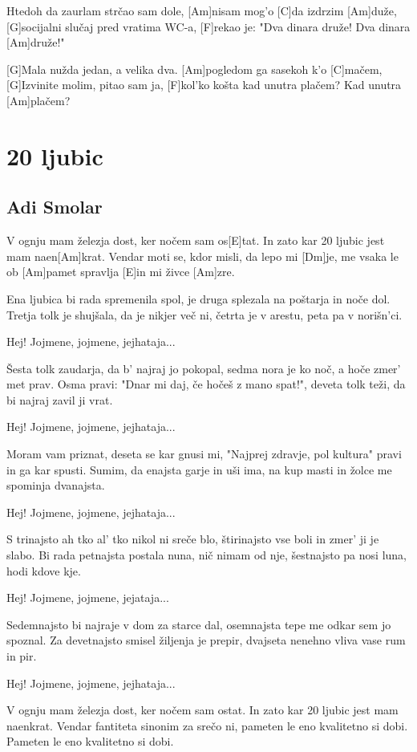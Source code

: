 \documentclass[a4paper,12pt]{article}
\begin{document}
\begin{multicols}{2}
\begin{guitar}
[G]Htedoh da zaurlam strčao sam dole,
[Am]nisam mog'o [C]da izdrzim [Am]duže,
[G]socijalni slučaj pred vratima WC-a,
[F]rekao je: "Dva dinara druže! 
Dva dinara [Am]druže!"


[G]Mala nužda jedan, a velika dva.
[Am]pogledom ga sasekoh k'o [C]mačem,
[G]Izvinite molim, pitao sam ja,
[F]kol'ko košta kad unutra plačem? 
Kad unutra [Am]plačem?
\end{guitar}
\section{20 ljubic}
\subsection*{Adi Smolar}
\begin{guitar}
[Am]V ognju mam železja dost, 
ker nočem sam os[E]tat.
In zato kar 20 ljubic jest mam naen[Am]krat.
Vendar moti se, kdor misli, da lepo mi [Dm]je,
me vsaka le ob [Am]pamet spravlja [E]in mi živce [Am]zre.


Ena ljubica bi rada spremenila spol,
je druga splezala na poštarja in noče dol.
Tretja tolk je shujšala, da je nikjer več ni,
četrta je v arestu, peta pa v norišn'ci.


Hej! 
Jojmene, jojmene, jejhataja...


Šesta tolk zaudarja, da b' najraj jo pokopal,
sedma nora je ko noč, a hoče zmer' met prav.
Osma pravi: "Dnar mi daj, 
če hočeš z mano spat!",
deveta tolk teži, da bi najraj zavil ji vrat.


Hej! 
Jojmene, jojmene, jejhataja...


Moram vam priznat, deseta se kar gnusi mi,
"Najprej zdravje, pol kultura" pravi 
in ga kar spusti.
Sumim, da enajsta garje in uši ima,
na kup masti in žolce me spominja dvanajsta.


Hej! 
Jojmene, jojmene, jejhataja...


S trinajsto ah tko al' tko nikol ni sreče blo,
štirinajsto vse boli in zmer' ji je slabo.
Bi rada petnajsta postala nuna, 
nič nimam od nje,
šestnajsto pa nosi luna, hodi kdove kje.


Hej! 
Jojmene, jojmene, jejataja...


Sedemnajsto bi najraje v dom za starce dal,
osemnajsta tepe me odkar sem jo spoznal.
Za devetnajsto smisel žiljenja je prepir,
dvajseta nenehno vliva vase rum in pir.


Hej! 
Jojmene, jojmene, jejhataja...


V ognju mam železja dost, 
ker nočem sam ostat.
In zato kar 20 ljubic jest mam naenkrat.
Vendar fantiteta sinonim za srečo ni,
pameten le eno kvalitetno si dobi.
Pameten le eno kvalitetno si dobi.
\end{guitar}

\end{multicols}
\end{document}
